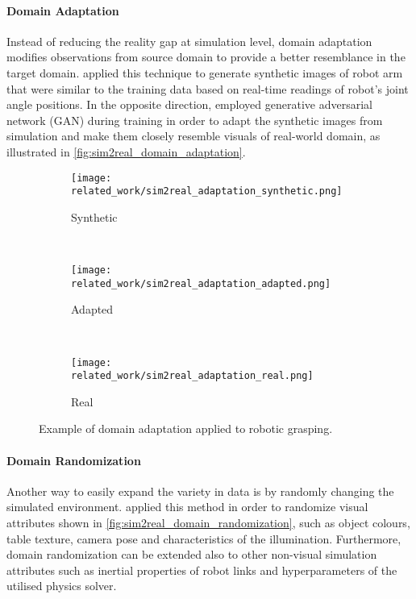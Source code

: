 \paragraph{Domain Adaptation} Instead of reducing the reality gap at simulation level, domain adaptation modifies observations from source domain to provide a better resemblance in the target domain. \citet{zhang_towards_2015} applied this technique to generate synthetic images of robot arm that were similar to the training data based on real-time readings of robot's joint angle positions. In the opposite direction, \citet{bousmalis_using_2018} employed generative adversarial network (GAN) during training in order to adapt the synthetic images from simulation and make them closely resemble visuals of real-world domain, as illustrated in \autoref{fig:sim2real_domain_adaptation}.

\begin{figure}[ht]
    \centering
    \begin{subfigure}[ht]{0.25\textwidth}
        \centering
        \texttt{[image: related\_work/sim2real\_adaptation\_synthetic.png]}
        \caption*{Synthetic}
    \end{subfigure}%
    ~
    \begin{subfigure}[ht]{0.25\textwidth}
        \centering
        \texttt{[image: related\_work/sim2real\_adaptation\_adapted.png]}
        \caption*{Adapted}
    \end{subfigure}%
    ~
    \begin{subfigure}[ht]{0.25\textwidth}
        \centering
        \texttt{[image: related\_work/sim2real\_adaptation\_real.png]}
        \caption*{Real}
    \end{subfigure}%
    \caption{Example of domain adaptation applied to robotic grasping.~\protect\cite{bousmalis_using_2018}}
    \label{fig:sim2real_domain_adaptation}
\end{figure}


\paragraph{Domain Randomization} Another way to easily expand the variety in data is by randomly changing the simulated environment. \citet{tobin_domain_2017} applied this method in order to randomize visual attributes shown in \autoref{fig:sim2real_domain_randomization}, such as object colours, table texture, camera pose and characteristics of the illumination. Furthermore, domain randomization can be extended also to other non-visual simulation attributes such as inertial properties of robot links and hyperparameters of the utilised physics solver.

